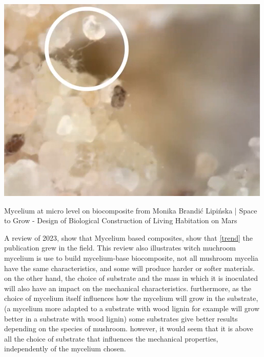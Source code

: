 \begin{marginfigure}
    \centering
    \includegraphics{images/bond-mycelium.png}    
    \caption{Mycelium at micro level on biocomposite from  Monika Brandić Lipińska | Space to Grow - Design of Biological Construction of Living Habitation on Mars}
    \label{fig:myco-bond}
\end{marginfigure}

A review of 2023\cite{alaneme2023mycelium}, show that Mycelium based composites, show that \ref{trend} the publication grew in the field.
This review also illustrates witch muchroom mycelium is use to build mycelium-base biocomposite, not all mushroom mycelia have the same characteristics, and some will produce harder or softer materials. on the other hand, the choice of substrate and the mass in which it is inoculated will also have an impact on the mechanical characteristics. furthermore, as the choice of mycelium itself influences how the mycelium will grow in the substrate, (a mycelium more adapted to a substrate with wood lignin for example will grow better in a substrate with wood lignin) some substrates give better results depending on the species of mushroom. 
however, it would seem that it is above all the choice of substrate that influences the mechanical properties, independently of the mycelium chosen.  


